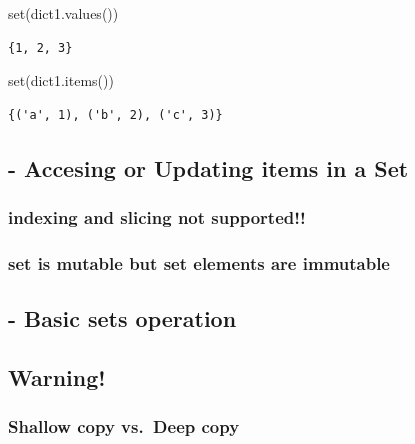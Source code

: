 \documentclass[
  a4paper,
  DIV=11,
  numbers=noendperiod]{scrreprt}
\newenvironment{Shaded}{\begin{snugshade}}{\end{snugshade}}
\newcommand{\BuiltInTok}[1]{\textcolor[rgb]{0.00,0.23,0.31}{#1}}
\newcommand{\NormalTok}[1]{\textcolor[rgb]{0.00,0.23,0.31}{#1}}
\begin{document}
\begin{Shaded}
\begin{Highlighting}[]
\BuiltInTok{set}\NormalTok{(dict1.values())}
\end{Highlighting}
\end{Shaded}

\begin{verbatim}
{1, 2, 3}
\end{verbatim}

\begin{Shaded}
\begin{Highlighting}[]
\BuiltInTok{set}\NormalTok{(dict1.items())}
\end{Highlighting}
\end{Shaded}

\begin{verbatim}
{('a', 1), ('b', 2), ('c', 3)}
\end{verbatim}

\subsection{- Accesing or Updating items in a
Set}\label{accesing-or-updating-items-in-a-set}

\subsubsection{indexing and slicing not
supported!!}\label{indexing-and-slicing-not-supported}

\subsubsection{set is mutable but set elements are
immutable}\label{set-is-mutable-but-set-elements-are-immutable}

\subsection{- Basic sets operation}\label{basic-sets-operation}

\subsection{Warning!}\label{warning}

\subsubsection{Shallow copy vs.~Deep
copy}\label{shallow-copy-vs.-deep-copy}
\end{document}
